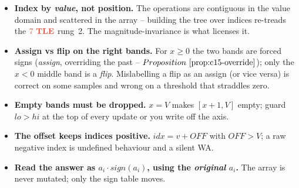 
\begin{hardeningbox}
\begin{itemize}[nosep,leftmargin=1.4em]
  \item \textbf{Index by \emph{value}, not position.} The operations are contiguous in the
        value domain and scattered in the array -- building the tree over indices re-treads
        the \(\tle\) rung~2. The magnitude-invariance is what licenses it.
  \item \textbf{Assign vs flip on the right bands.} For \(x\ge0\) the two bands are forced
        signs (\emph{assign}, overriding the past -- \(\propref{c15-override}\)); only the
        \(x<0\) middle band is a \emph{flip}. Mislabelling a flip as an assign (or vice
        versa) is correct on some samples and wrong on a threshold that straddles zero.
  \item \textbf{Empty bands must be dropped.} \(x=V\) makes \([x{+}1,V]\) empty; guard
        \(\mathit{lo}>\mathit{hi}\) at the top of every update or you write off the axis.
  \item \textbf{The offset keeps indices positive.} \(\mathit{idx}=v+\mathit{OFF}\) with
        \(\mathit{OFF}>V\); a raw negative index is undefined behaviour and a silent WA.
  \item \textbf{Read the answer as \(a_i\cdot\mathit{sign}(a_i)\), using the
        \emph{original} \(a_i\).} The array is never mutated; only the sign table moves.
\end{itemize}
\end{hardeningbox}

